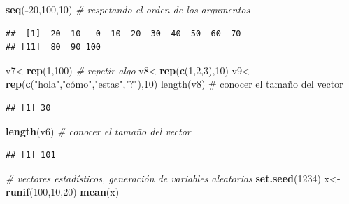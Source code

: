 \documentclass[
]{book}
\newenvironment{Shaded}{\begin{snugshade}}{\end{snugshade}}
\newcommand{\CommentTok}[1]{\textcolor[rgb]{0.56,0.35,0.01}{\textit{#1}}}
\newcommand{\DecValTok}[1]{\textcolor[rgb]{0.00,0.00,0.81}{#1}}
\newcommand{\KeywordTok}[1]{\textcolor[rgb]{0.13,0.29,0.53}{\textbf{#1}}}
\newcommand{\NormalTok}[1]{#1}
\newcommand{\OperatorTok}[1]{\textcolor[rgb]{0.81,0.36,0.00}{\textbf{#1}}}
\newcommand{\StringTok}[1]{\textcolor[rgb]{0.31,0.60,0.02}{#1}}
\begin{document}
\begin{Shaded}
\begin{Highlighting}[]
\KeywordTok{seq}\NormalTok{(}\OperatorTok{-}\DecValTok{20}\NormalTok{,}\DecValTok{100}\NormalTok{,}\DecValTok{10}\NormalTok{) }\CommentTok{# respetando el orden de los argumentos}
\end{Highlighting}
\end{Shaded}

\begin{verbatim}
##  [1] -20 -10   0  10  20  30  40  50  60  70
## [11]  80  90 100
\end{verbatim}

\begin{Shaded}
\begin{Highlighting}[]
\NormalTok{v7<-}\KeywordTok{rep}\NormalTok{(}\DecValTok{1}\NormalTok{,}\DecValTok{100}\NormalTok{) }\CommentTok{# repetir algo }
\NormalTok{v8<-}\KeywordTok{rep}\NormalTok{(}\KeywordTok{c}\NormalTok{(}\DecValTok{1}\NormalTok{,}\DecValTok{2}\NormalTok{,}\DecValTok{3}\NormalTok{),}\DecValTok{10}\NormalTok{)}
\NormalTok{v9<-}\KeywordTok{rep}\NormalTok{(}\KeywordTok{c}\NormalTok{(}\StringTok{"hola"}\NormalTok{,}\StringTok{"cómo","}\NormalTok{estas}\StringTok{","}\NormalTok{?}\StringTok{"),10)}
\StringTok{length(v8) # conocer el tamaño del vector}
\end{Highlighting}
\end{Shaded}

\begin{verbatim}
## [1] 30
\end{verbatim}

\begin{Shaded}
\begin{Highlighting}[]
\KeywordTok{length}\NormalTok{(v6) }\CommentTok{# conocer el tamaño del vector}
\end{Highlighting}
\end{Shaded}

\begin{verbatim}
## [1] 101
\end{verbatim}

\begin{Shaded}
\begin{Highlighting}[]
\CommentTok{# vectores estadísticos, generación de variables aleatorias}
\KeywordTok{set.seed}\NormalTok{(}\DecValTok{1234}\NormalTok{)}
\NormalTok{x<-}\KeywordTok{runif}\NormalTok{(}\DecValTok{100}\NormalTok{,}\DecValTok{10}\NormalTok{,}\DecValTok{20}\NormalTok{)}
\KeywordTok{mean}\NormalTok{(x)}
\end{Highlighting}
\end{Shaded}
\end{document}
